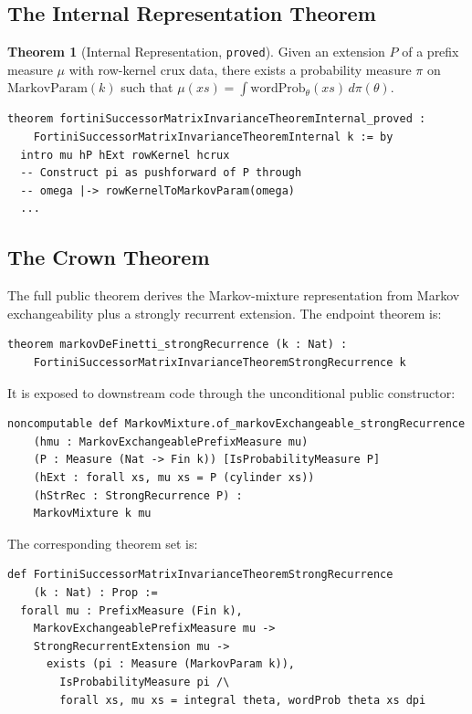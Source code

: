 \documentclass[11pt,a4paper]{article}
\theoremstyle{definition}
\newtheorem{theorem}{Theorem}[section]
\begin{document}
\subsection{The Internal Representation Theorem}

\begin{theorem}[Internal Representation, \texttt{proved}]
\label{thm:internal}
Given an extension $P$ of a prefix measure $\mu$ with row-kernel crux data,
there exists a probability measure $\pi$ on $\mathrm{MarkovParam}(k)$ such that
$\mu(xs) = \int \mathrm{wordProb}_\theta(xs) \, d\pi(\theta)$.
\end{theorem}

\begin{lstlisting}
theorem fortiniSuccessorMatrixInvarianceTheoremInternal_proved :
    FortiniSuccessorMatrixInvarianceTheoremInternal k := by
  intro mu hP hExt rowKernel hcrux
  -- Construct pi as pushforward of P through
  -- omega |-> rowKernelToMarkovParam(omega)
  ...
\end{lstlisting}

\subsection{The Crown Theorem}

The full public theorem derives the Markov-mixture representation from Markov
exchangeability plus a strongly recurrent extension. The endpoint theorem is:

\begin{lstlisting}
theorem markovDeFinetti_strongRecurrence (k : Nat) :
    FortiniSuccessorMatrixInvarianceTheoremStrongRecurrence k
\end{lstlisting}

It is exposed to downstream code through the unconditional public constructor:

\begin{lstlisting}
noncomputable def MarkovMixture.of_markovExchangeable_strongRecurrence
    (hmu : MarkovExchangeablePrefixMeasure mu)
    (P : Measure (Nat -> Fin k)) [IsProbabilityMeasure P]
    (hExt : forall xs, mu xs = P (cylinder xs))
    (hStrRec : StrongRecurrence P) :
    MarkovMixture k mu
\end{lstlisting}

The corresponding theorem set is:

\begin{lstlisting}
def FortiniSuccessorMatrixInvarianceTheoremStrongRecurrence
    (k : Nat) : Prop :=
  forall mu : PrefixMeasure (Fin k),
    MarkovExchangeablePrefixMeasure mu ->
    StrongRecurrentExtension mu ->
      exists (pi : Measure (MarkovParam k)),
        IsProbabilityMeasure pi /\
        forall xs, mu xs = integral theta, wordProb theta xs dpi
\end{lstlisting}
\end{document}
